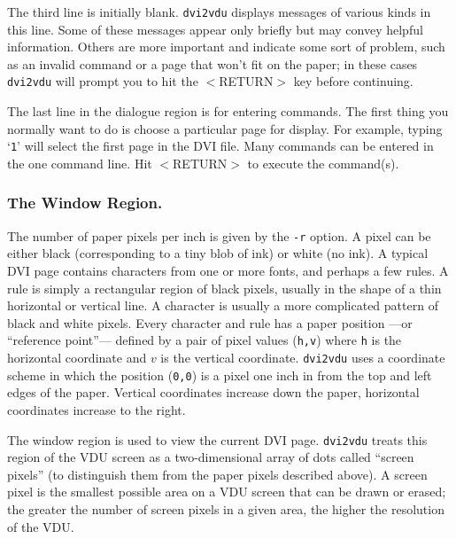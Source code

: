 The third line is initially blank.  {\tt dvi2vdu} displays messages of various
kinds in this line.  Some of these messages appear only briefly but may convey
helpful information.
Others are more important and indicate some sort of problem, such as
an invalid command or a page that won't fit on the paper;
in these cases {\tt dvi2vdu} will prompt you to hit the $<$RETURN$>$ key
before continuing.

The last line in the dialogue region is for entering commands.  The first
thing you normally want to do is choose a particular page for display.
For example, typing `{\tt 1}' will select the first page in the DVI file.
Many commands can be entered in the one command line.  Hit $<$RETURN$>$ to
execute the command(s).

\subsubsection{The Window Region.}

The number of paper pixels per inch is given by the {\tt -r} option.
A pixel can be either black (corresponding to a tiny blob of ink) or white
(no ink).
A typical DVI page contains characters from one or more fonts, and
perhaps a few rules.
A rule is simply a rectangular region of black pixels, usually in the shape of
a thin horizontal or vertical line.
A character is usually a more complicated pattern of black and white pixels.
Every character and rule has a
paper position ---or ``reference point''--- defined
by a pair of pixel values ({\tt h,v})
where {\tt h} is the horizontal coordinate and $v$ is the vertical coordinate.
{\tt dvi2vdu} uses a coordinate scheme in which the
position ({\tt 0,0}) is a pixel one inch in from the top and left edges of
the paper.  Vertical coordinates increase down the paper,
horizontal coordinates increase to the right. 

The window region is used to view the current DVI page.
{\tt dvi2vdu} treats this region of the VDU screen as a two-dimensional array
of dots called ``screen pixels'' (to distinguish them
from the paper pixels described above).
A screen pixel is the smallest possible area on a VDU screen that
can be drawn or erased; the greater the number of screen pixels in a given area,
the higher the resolution of the VDU.

